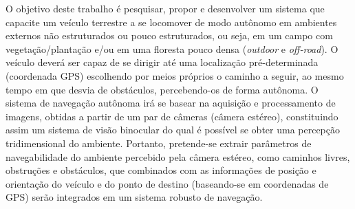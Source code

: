 \begin{resumo}

O objetivo deste trabalho é pesquisar, propor e desenvolver um sistema que
capacite um veículo terrestre a se locomover de modo autônomo em ambientes
externos não estruturados ou pouco estruturados, ou seja, em um campo com
vegetação/plantação e/ou em uma floresta pouco densa (\textit{outdoor} e
\textit{off-road}). O veículo deverá ser capaz de se dirigir até uma localização
pré-determinada (coordenada GPS) escolhendo por meios próprios o caminho a
seguir, ao mesmo tempo em que desvia de obstáculos, percebendo-os de forma
autônoma. O sistema de navegação autônoma irá se basear na aquisição e
processamento de imagens, obtidas a partir de um par de câmeras (câmera
estéreo), constituindo assim um sistema de visão binocular do qual é possível se
obter uma percepção tridimensional do ambiente. Portanto, pretende-se extrair
parâmetros de navegabilidade do ambiente percebido pela câmera estéreo, como
caminhos livres, obstruções e obstáculos, que combinados com as informações de
posição e orientação do veículo e do ponto de destino (baseando-se em
coordenadas de GPS) serão integrados em um sistema robusto de navegação.


\end{resumo}
